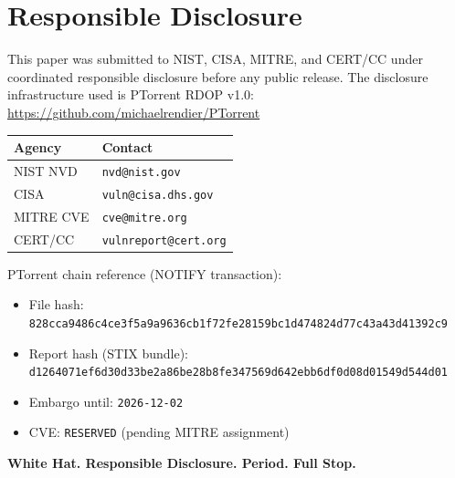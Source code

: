 \documentclass[runningheads]{llncs}
\theoremstyle{plain}
\theoremstyle{definition}
\begin{document}
\section{Responsible Disclosure}
\label{app:disclosure}

This paper was submitted to NIST, CISA, MITRE, and CERT/CC under
coordinated responsible disclosure before any public release.
The disclosure infrastructure used is PTorrent RDOP v1.0:
\url{https://github.com/michaelrendier/PTorrent}

\begin{center}
\begin{tabular}{ll}
\toprule
Agency & Contact \\
\midrule
NIST NVD & \texttt{nvd@nist.gov} \\
CISA & \texttt{vuln@cisa.dhs.gov} \\
MITRE CVE & \texttt{cve@mitre.org} \\
CERT/CC & \texttt{vulnreport@cert.org} \\
\bottomrule
\end{tabular}
\end{center}

PTorrent chain reference (NOTIFY transaction):
\begin{itemize}
\item File hash: \texttt{828cca9486c4ce3f5a9a9636cb1f72fe28159bc1d474824d77c43a43d41392c9}
\item Report hash (STIX bundle): \texttt{d1264071ef6d30d33be2a86be28b8fe347569d642ebb6df0d08d01549d544d01}
\item Embargo until: \texttt{2026-12-02}
\item CVE: \texttt{RESERVED} (pending MITRE assignment)
\end{itemize}

\textbf{White Hat. Responsible Disclosure. Period. Full Stop.}
\end{document}

